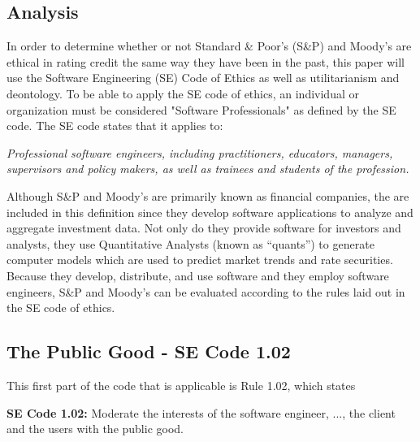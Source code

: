 \documentclass[11pt]{article}
\begin{document}
\begin{multicols}{2}


\section{Analysis}
In order to determine whether or not Standard \& Poor's (S\&P) and Moody's are ethical in rating credit the same way they have been in the past, this paper will use the Software Engineering (SE) Code of Ethics as well as utilitarianism and deontology.  To be able to apply the SE code of ethics, an individual or organization must be considered "Software Professionals" as defined by the SE code. The SE code states that it applies to:

\textit{Professional software engineers, including practitioners, educators, managers, supervisors and policy makers, as well as trainees and students of the profession.}
\newline

Although S\&P and Moody's are primarily known as financial companies, the are included in this definition since they develop software applications to analyze and aggregate investment data. \cite{SnP, Moodys} Not only do they provide software for investors and analysts, they use Quantitative Analysts (known as ``quants'') to generate computer models which are used to predict market trends and rate securities. \cite{quantsRole, govtReport}  Because they develop, distribute, and use software and they employ software engineers, S\&P and Moody's can be evaluated according to the rules laid out in the SE code of ethics. 

\subsection{The Public Good - SE Code 1.02}
This first part of the code that is applicable is Rule 1.02, which states
 
\begin{framed}
\noindent
   \textbf{SE Code 1.02: }     
   \newline
   Moderate the interests of the software engineer, ..., the client and the users with the public good.
\end{framed}


\end{multicols}
\end{document}
